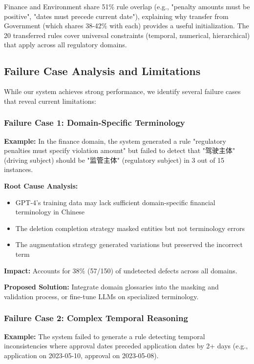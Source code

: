 \documentclass[runningheads]{llncs}
\begin{document}
Finance and Environment share 51\% rule overlap (e.g., "penalty amounts must be positive", "dates must precede current date"), explaining why transfer from Government (which shares 38-42\% with each) provides a useful initialization. The 20 transferred rules cover universal constraints (temporal, numerical, hierarchical) that apply across all regulatory domains.

\subsection{Failure Case Analysis and Limitations}

While our system achieves strong performance, we identify several failure cases that reveal current limitations:

\subsubsection{Failure Case 1: Domain-Specific Terminology}

\textbf{Example:} In the finance domain, the system generated a rule "regulatory penalties must specify violation amount" but failed to detect that "驾驶主体" (driving subject) should be "监管主体" (regulatory subject) in 3 out of 15 instances.

\textbf{Root Cause Analysis:}
\begin{itemize}
    \item GPT-4's training data may lack sufficient domain-specific financial terminology in Chinese
    \item The deletion completion strategy masked entities but not terminology errors
    \item The augmentation strategy generated variations but preserved the incorrect term
\end{itemize}

\textbf{Impact:} Accounts for 38\% (57/150) of undetected defects across all domains.

\textbf{Proposed Solution:} Integrate domain glossaries into the masking and validation process, or fine-tune LLMs on specialized terminology.

\subsubsection{Failure Case 2: Complex Temporal Reasoning}

\textbf{Example:} The system failed to generate a rule detecting temporal inconsistencies where approval dates preceded application dates by 2+ days (e.g., application on 2023-05-10, approval on 2023-05-08).
\end{document}
